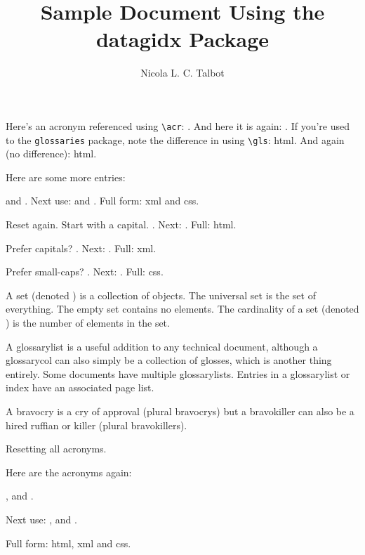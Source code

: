 \documentclass{article}
\title{Sample Document Using the datagidx Package}
\author{Nicola L. C. Talbot}
\begin{document}
\maketitle

Here's an acronym referenced using \verb|\acr|: .
And here
it is again: . If you're used to the \texttt{glossaries}
package, note the difference in using \verb|\gls|: \gls{html}.
And again (no difference): \gls{html}.

Here are some more entries:

 and .
Next use:
 and .
Full form:
\gls{xml} and \gls{css}.

Reset again. %
Start with a capital. .
Next: . Full: \Gls{html}.

Prefer capitals?
\renewcommand{\acronymfont}[1]{\MakeTextUppercase{#1}}%
. Next: . Full: \gls{xml}.

Prefer small-caps?
\renewcommand{\acronymfont}[1]{\textsc{#1}}%
. Next: . Full: \gls{css}.

A \gls{set} (denoted ) is a collection of objects.
The \gls{universal set} is the set of everything.
The \gls{empty set} contains no elements.
The \gls{cardinality} of a set (denoted ) is the
number of elements in the set.

A \gls{glossarylist} is a useful
addition to any technical document,
although a \gls{glossarycol} can also simply be a collection of
glosses, which is another thing entirely. Some documents have
multiple \glspl{glossarylist}. Entries in a \gls{glossarylist} or 
\gls{index} have an associated \gls{page list}. 

A \gls{bravocry} is a cry of approval (plural \glspl{bravocry}) but
a
\gls{bravokiller} can also be a hired ruffian or killer (plural
\glspl{bravokiller}).

\newpage

Resetting all acronyms.

Here are the acronyms again:

,  and .

Next use:
,  and .

Full form:
\Gls{html}, \gls{xml} and \gls{css}.


\newpage

\printterms
 [
   database=glossary,%
   columns=1,%
   postdesc=dot,%
   style=gloss,%
   namefont={\textbf},%
   namecase=firstuc,%
   child=noname,%
   location=hide%
 ]
\end{document}
